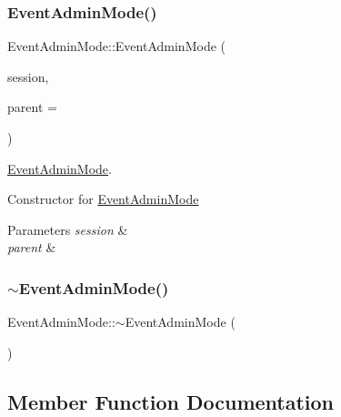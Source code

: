 \subsubsection{\texorpdfstring{Event\+Admin\+Mode()}{EventAdminMode()}}
{\footnotesize\ttfamily Event\+Admin\+Mode\+::\+Event\+Admin\+Mode (\begin{DoxyParamCaption}\item[{\hyperlink{class_session}{Session} $\ast$}]{session,  }\item[{Q\+Widget $\ast$}]{parent = {} }\end{DoxyParamCaption})\hspace{0.3cm}{\ttfamily [explicit]}}



\hyperlink{class_event_admin_mode}{Event\+Admin\+Mode}. 

Constructor for \hyperlink{class_event_admin_mode}{Event\+Admin\+Mode} 
\begin{DoxyParams}{Parameters}
{\em session} & \\
\hline
{\em parent} & \\
\hline
\end{DoxyParams}
\mbox{\label{class_event_admin_mode_a8b5cc3b5ad2067b0f97d7764d2520ca9}} 
\subsubsection{\texorpdfstring{$\sim$\+Event\+Admin\+Mode()}{~EventAdminMode()}}
{\footnotesize\ttfamily Event\+Admin\+Mode\+::$\sim$\+Event\+Admin\+Mode (\begin{DoxyParamCaption}{ }\end{DoxyParamCaption})}



\subsection{Member Function Documentation}
\mbox{\label{class_event_admin_mode_a22d5e21b4a4450e1917085c2375239c9}} 

